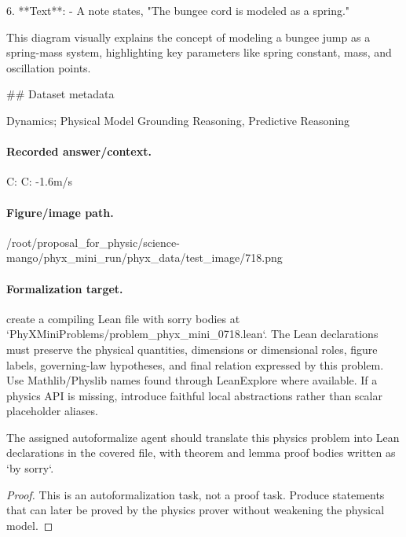6. **Text**:
   - A note states, "The bungee cord is modeled as a spring."

This diagram visually explains the concept of modeling a bungee jump as a spring-mass system, highlighting key parameters like spring constant, mass, and oscillation points.

\#\# Dataset metadata

Dynamics; Physical Model Grounding Reasoning, Predictive Reasoning

\paragraph{Recorded answer/context.}
C: C: -1.6m/s

\paragraph{Figure/image path.}
/root/proposal\_for\_physic/science-mango/phyx\_mini\_run/phyx\_data/test\_image/718.png

\paragraph{Formalization target.}
create a compiling Lean file with sorry bodies at `PhyXMiniProblems/problem\_phyx\_mini\_0718.lean`. The Lean declarations must preserve the physical quantities, dimensions or dimensional roles, figure labels, governing-law hypotheses, and final relation expressed by this problem.
Use Mathlib/Physlib names found through LeanExplore where available. If a physics API is missing, introduce faithful local abstractions rather than scalar placeholder aliases.

\begin{theorem}
\label{thm:physics:phyx_mini_0718:target}
The assigned autoformalize agent should translate this physics problem into Lean declarations in the covered file, with theorem and lemma proof bodies written as `by sorry`.
\end{theorem}
\begin{proof}
This is an autoformalization task, not a proof task. Produce statements that can later be proved by the physics prover without weakening the physical model.
\end{proof}

